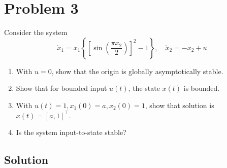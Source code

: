 \section*{Problem 3}

Consider the system
\begin{equation*}
    \dot{x}_{1}=x_{1}\left\{\left[\sin \left(\frac{\pi x_{2}}{2}\right)\right]^{2}-1\right\}, \quad \dot{x}_{2}=-x_{2}+u
\end{equation*}
\begin{enumerate}[label= (\alph*)]
    \item With \( u=0 \), show that the origin is globally asymptotically stable.
    \item Show that for bounded input \( u(t) \), the state \( x(t) \) is bounded.
    \item With \( u(t)=1, x_{1}(0)=a, x_{2}(0)=1 \), show that solution is \( x(t)=[a, 1]^{\top} \).
    \item Is the system input-to-state stable?
\end{enumerate}

\subsection*{Solution}
